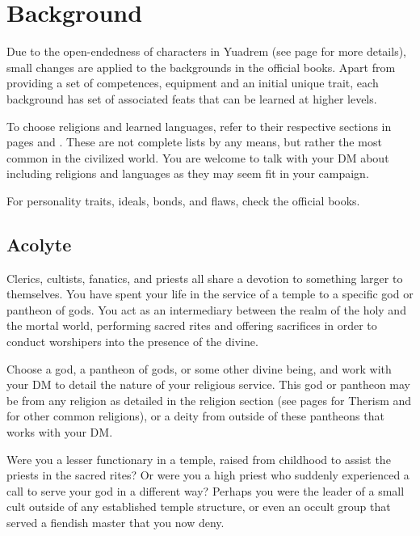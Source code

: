 \section{Background} \label{sec::background}
Due to the open-endedness of characters in Yuadrem (see page \pageref{sec::classlessdnd} for more details), small changes are applied to the backgrounds in the official books.
Apart from providing a set of competences, equipment and an initial unique trait, each background has set of associated feats that can be learned at higher levels.

To choose religions and learned languages, refer to their respective sections in pages \pageref{ssec::religions} and \pageref{ssec::languages}.
These are not complete lists by any means, but rather the most common in the civilized world.
You are welcome to talk with your DM about including religions and languages as they may seem fit in your campaign.

For personality traits, ideals, bonds, and flaws, check the official books.

\subsection*{Acolyte} \label{ssec::acolyte}
    Clerics, cultists, fanatics, and priests all share a devotion to something larger to themselves.
    You have spent your life in the service of a temple to a specific god or pantheon of gods.
    You act as an intermediary between the realm of the holy and the mortal world, performing sacred rites and offering sacrifices in order to conduct worshipers into the presence of the divine.

    Choose a god, a pantheon of gods, or some other divine being, and work with your DM to detail the nature of your religious service.
    This god or pantheon may be from any religion as detailed in the religion section (see pages \pageref{ssec::therism} for Therism and \pageref{ssec::religions} for other common religions), or a deity from outside of these pantheons that works with your DM.

    Were you a lesser functionary in a temple, raised from childhood to assist the priests in the sacred rites?
    Or were you a high priest who suddenly experienced a call to serve your god in a different way?
    Perhaps you were the leader of a small cult outside of any established temple structure, or even an occult group that served a fiendish master that you now deny.

